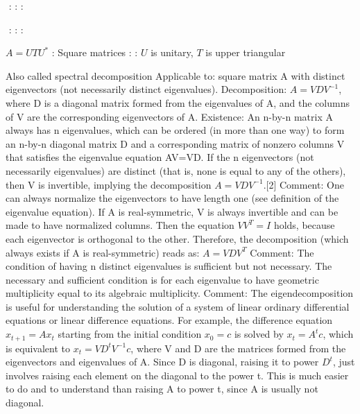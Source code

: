 \begin{slide}[ SVD]
   $ $
   :
   : 
   :
\end{slide}
\begin{slide}
   $ $
   :
   : 
   :
\end{slide}
\begin{slide}
   $ A = UTU^{*}$
   : Square matrices
   : 
   :
    $U$ is unitary, $T$ is upper triangular
\end{slide}

\begin{slide}
  Also called spectral decomposition
  Applicable to: square matrix A with distinct eigenvectors (not necessarily distinct eigenvalues).
  Decomposition: $A=VDV^{-1}$, where D is a diagonal matrix formed from the eigenvalues of A, and the columns of V are the corresponding eigenvectors of A.
  Existence: An n-by-n matrix A always has n eigenvalues, which can be ordered (in more than one way) to form an n-by-n diagonal matrix D and a corresponding matrix of nonzero columns V that satisfies the eigenvalue equation AV=VD. If the n eigenvectors (not necessarily eigenvalues) are distinct (that is, none is equal to any of the others), then V is invertible, implying the decomposition $A=VDV^{-1}$.[2]
  Comment: One can always normalize the eigenvectors to have length one (see definition of the eigenvalue equation). If A is real-symmetric, V is always invertible and can be made to have normalized columns. Then the equation $VV^T=I$ holds, because each eigenvector is orthogonal to the other. Therefore, the decomposition (which always exists if A is real-symmetric) reads as: $A=VDV^T$
  Comment: The condition of having n distinct eigenvalues is sufficient but not necessary. The necessary and sufficient condition is for each eigenvalue to have geometric multiplicity equal to its algebraic multiplicity.
  Comment: The eigendecomposition is useful for understanding the solution of a system of linear ordinary differential equations or linear difference equations. For example, the difference equation $x_{t+1}=Ax_t$ starting from the initial condition $x_0=c$ is solved by $x_t = A^tc$, which is equivalent to $x_t = VD^tV^{-1}c$, where V and D are the matrices formed from the eigenvectors and eigenvalues of A. Since D is diagonal, raising it to power $D^t$, just involves raising each element on the diagonal to the power t. This is much easier to do and to understand than raising A to power t, since A is usually not diagonal.

\end{slide}
